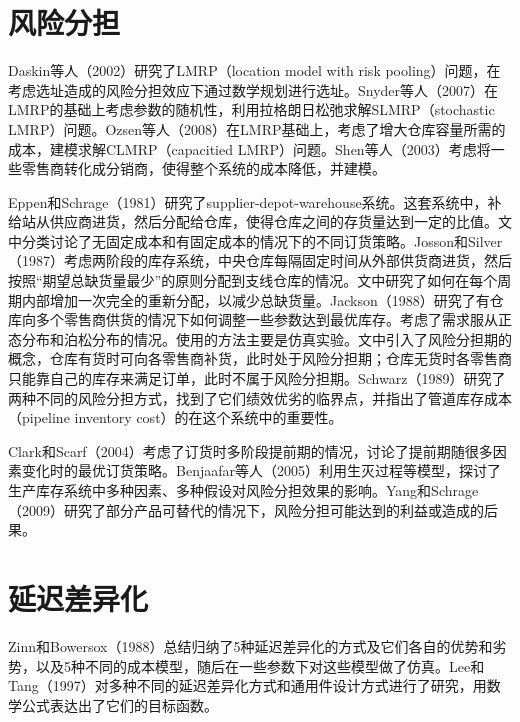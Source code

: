 \section{风险分担}

Daskin等人（2002）\cite{daskin_inventory-location_2002}研究了LMRP（location model with risk pooling）问题，在考虑选址造成的风险分担效应下通过数学规划进行选址。Snyder等人（2007）\cite{snyder_stochastic_2007}在LMRP的基础上考虑参数的随机性，利用拉格朗日松弛求解SLMRP（stochastic LMRP）问题。Ozsen等人（2008）\cite{ozsen_capacitated_2008}在LMRP基础上，考虑了增大仓库容量所需的成本，建模求解CLMRP（capacitied LMRP）问题。Shen等人（2003）\cite{shen_joint_2003}考虑将一些零售商转化成分销商，使得整个系统的成本降低，并建模。

Eppen和Schrage（1981）\cite{eppen_centralized_1981}研究了supplier-depot-warehouse系统。这套系统中，补给站从供应商进货，然后分配给仓库，使得仓库之间的存货量达到一定的比值。文中分类讨论了无固定成本和有固定成本的情况下的不同订货策略。Josson和Silver（1987）\cite{jonsson_analysis_1987}考虑两阶段的库存系统，中央仓库每隔固定时间从外部供货商进货，然后按照“期望总缺货量最少”的原则分配到支线仓库的情况。文中研究了如何在每个周期内部增加一次完全的重新分配，以减少总缺货量。Jackson（1988）\cite{jackson_stock_1988}研究了有仓库向多个零售商供货的情况下如何调整一些参数达到最优库存。考虑了需求服从正态分布和泊松分布的情况。使用的方法主要是仿真实验。文中引入了风险分担期的概念，仓库有货时可向各零售商补货，此时处于风险分担期；仓库无货时各零售商只能靠自己的库存来满足订单，此时不属于风险分担期。Schwarz（1989）\cite{schwarz_model_1989}研究了两种不同的风险分担方式，找到了它们绩效优劣的临界点，并指出了管道库存成本（pipeline inventory cost）的在这个系统中的重要性。

Clark和Scarf（2004）\cite{clark_optimal_2004}考虑了订货时多阶段提前期的情况，讨论了提前期随很多因素变化时的最优订货策略。Benjaafar等人（2005）\cite{benjaafar_benefits_2005}利用生灭过程等模型，探讨了生产库存系统中多种因素、多种假设对风险分担效果的影响。Yang和Schrage（2009）\cite{yang_conditions_2009}研究了部分产品可替代的情况下，风险分担可能达到的利益或造成的后果。









\section{延迟差异化}

Zinn和Bowersox（1988）\cite{zinn_planning_1988}总结归纳了5种延迟差异化的方式及它们各自的优势和劣势，以及5种不同的成本模型，随后在一些参数下对这些模型做了仿真。Lee和Tang（1997）\cite{lee_modelling_1997}对多种不同的延迟差异化方式和通用件设计方式进行了研究，用数学公式表达出了它们的目标函数。

